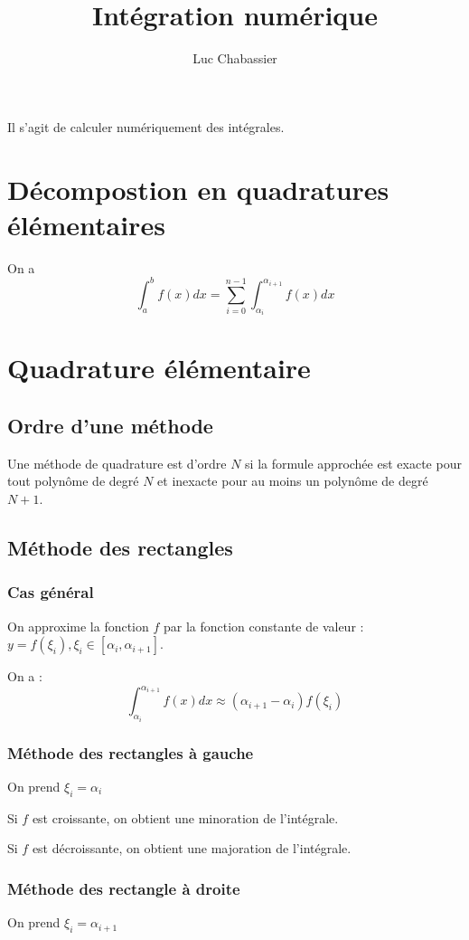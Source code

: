 \documentclass{article}
\title{Intégration numérique}
\author{Luc Chabassier}
\begin{document}
\maketitle

Il s'agit de calculer numériquement des intégrales.

\section{Décompostion en quadratures élémentaires}
On a \[\int_a^b f(x)dx = \sum_{i=0}^{n-1} \int_{\alpha_i}^{\alpha_{i+1}} f(x)dx \]

\section{Quadrature élémentaire}
\subsection{Ordre d'une méthode}
Une méthode de quadrature est d'ordre $N$ si la formule approchée est exacte pour tout polynôme de degré $N$ et inexacte pour au moins un polynôme de degré $N+1$.

\subsection{Méthode des rectangles}
\subsubsection{Cas général}
On approxime la fonction $f$ par la fonction constante de valeur : $y = f(\xi_i), \xi_i \in [\alpha_i, \alpha_{i+1}]$.

On a : \begin{equation}
    \int_{\alpha_i}^{\alpha_{i+1}} f(x)dx \approx (\alpha_{i+1} - \alpha_i)f(\xi_i)
\end{equation}

\subsubsection{Méthode des rectangles à gauche}
On prend $\xi_i = \alpha_i$

Si $f$ est croissante, on obtient une minoration de l'intégrale.

Si $f$ est décroissante, on obtient une majoration de l'intégrale.

\subsubsection{Méthode des rectangle à droite}
On prend $\xi_i = \alpha_{i+1}$
\end{document}
